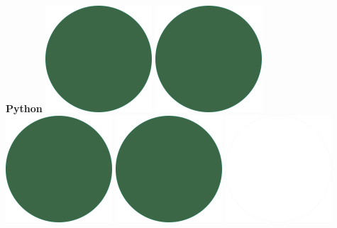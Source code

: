 \documentclass[]{commands}
\begin{document}
\begin{aside}
\textbf{Python}\hfill
\includegraphics[scale=0.11]{img/IPSGreenDots.png}
\includegraphics[scale=0.11]{img/IPSGreenDots.png}
\includegraphics[scale=0.11]{img/IPSGreenDots.png}
\includegraphics[scale=0.11]{img/IPSGreenDots.png}
\includegraphics[scale=0.11]{img/WhiteDots.png}


\end{aside}
\end{document}
